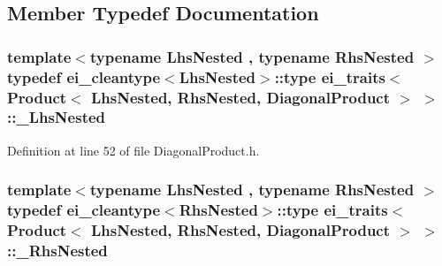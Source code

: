 \subsection{Member Typedef Documentation}
\hypertarget{structei__traits_3_01_product_3_01_lhs_nested_00_01_rhs_nested_00_01_diagonal_product_01_4_01_4_a46bed6c0520fb5701ba592e6768e823e}{
\subsubsection[{\-\_\-\-Lhs\-Nested}]{\setlength{\rightskip}{0pt plus 5cm}template$<$typename Lhs\-Nested , typename Rhs\-Nested $>$ typedef {\bf ei\-\_\-cleantype}$<$Lhs\-Nested$>$\-::{\bf type} {\bf ei\-\_\-traits}$<$ {\bf Product}$<$ Lhs\-Nested, Rhs\-Nested, {\bf Diagonal\-Product} $>$ $>$\-::{\bf \-\_\-\-Lhs\-Nested}}}\label{structei__traits_3_01_product_3_01_lhs_nested_00_01_rhs_nested_00_01_diagonal_product_01_4_01_4_a46bed6c0520fb5701ba592e6768e823e}


Definition at line 52 of file Diagonal\-Product.\-h.

\hypertarget{structei__traits_3_01_product_3_01_lhs_nested_00_01_rhs_nested_00_01_diagonal_product_01_4_01_4_ab7f94eb26f2e5f451245695e58d680fc}{
\subsubsection[{\-\_\-\-Rhs\-Nested}]{\setlength{\rightskip}{0pt plus 5cm}template$<$typename Lhs\-Nested , typename Rhs\-Nested $>$ typedef {\bf ei\-\_\-cleantype}$<$Rhs\-Nested$>$\-::{\bf type} {\bf ei\-\_\-traits}$<$ {\bf Product}$<$ Lhs\-Nested, Rhs\-Nested, {\bf Diagonal\-Product} $>$ $>$\-::{\bf \-\_\-\-Rhs\-Nested}}}\label{structei__traits_3_01_product_3_01_lhs_nested_00_01_rhs_nested_00_01_diagonal_product_01_4_01_4_ab7f94eb26f2e5f451245695e58d680fc}


